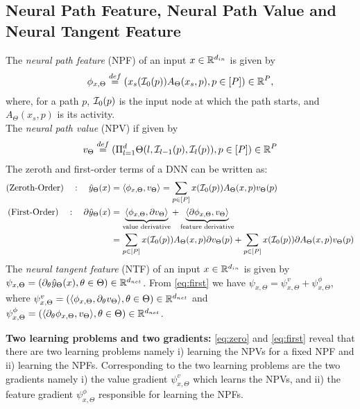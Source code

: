 \subsection{Neural Path Feature, Neural Path Value and Neural Tangent Feature}
The \emph{neural path feature} (NPF) of an input $x\in\mathbb{R}^{d_{in}}$ is given by 
\begin{align}\label{eq:npfdef}
\phi_{x,\Theta}\stackrel{def}=(x_s(\mathcal{I}_0(p))A_{\Theta}(x_s,p) ,p\in[P])\in\mathbb{R}^P,
\end{align}
where, for a path $p$, $\mathcal{I}_0(p)$ is the input node at which the path starts, and $A_{\Theta}(x_s,p)$ is its activity. \\
The \emph{neural path value} (NPV) if given by  
\begin{align}\label{eq:npvdef}
v_{\Theta}\stackrel{def}=(\Pi_{l=1}^d \Theta(l,\mathcal{I}_{l-1}(p),\mathcal{I}_l(p)),p\in[P])\in\mathbb{R}^P
\end{align}
The zeroth and first-order terms of a DNN can be written as:
\begin{align}
\label{eq:zero}\text{(Zeroth-Order)}\quad: \quad \hat{y}_{\Theta}(x)&=\langle \phi_{x,\Theta},v_{\Theta}\rangle=\sum_{p\in [P]}x(\mathcal{I}_0(p))A_{\Theta}(x,p)v_{\Theta}(p)\\
\label{eq:first}\text{(First-Order)}\quad: \quad \partial \hat{y}_{\Theta}(x)&=\underbrace{\langle \phi_{x,\Theta},\partial v_{\Theta}\rangle}_{\text{value derivative}}+ \underbrace{\langle \partial\phi_{x,\Theta},v_{\Theta}\rangle}_{\text{feature derivative}}\\&=\sum_{p\in [P]}x(\mathcal{I}_0(p)) A_{\Theta}(x,p) \partial v_{\Theta}(p)+\sum_{p\in [P]}x(\mathcal{I}_0(p)) \partial A_{\Theta}(x,p) v_{\Theta}(p)\nonumber
\end{align}
The \emph{neural tangent feature} (NTF) of an input $x\in\mathbb{R}^{d_{in}}$ is given by $\psi_{x,\Theta}=\left(\partial_{\theta}\hat{y}_{\Theta}(x),\theta\in\Theta\right)\in\mathbb{R}^{d_{net}}$. From \eqref{eq:first} we have $\psi_{x,\Theta}=\psi^v_{x,\Theta}+\psi^{\phi}_{x,\Theta}$, where $\psi^v_{x,\Theta}=\left(\langle \phi_{x,\Theta}, \partial_{\theta} v_{\Theta}\rangle,\theta\in\Theta\right)\in\mathbb{R}^{d_{net}}$ and  $\psi^{\phi}_{x,\Theta}=\left(\langle \partial_{\theta}\phi_{x,\Theta}, v_{\Theta}\rangle,\theta\in\Theta\right)\in\mathbb{R}^{d_{net}}$. 

\textbf{Two learning problems and two gradients:} \eqref{eq:zero} and \eqref{eq:first} reveal that there are two learning problems namely i) learning the NPVs for a fixed NPF and ii) learning the NPFs. Corresponding to the two learning problems are the two gradients namely i) the value gradient $\psi^v_{x,\Theta}$ which learns the NPVs, and ii) the feature gradient $\psi^{\phi}_{x,\Theta}$ responsible for learning the NPFs. 

